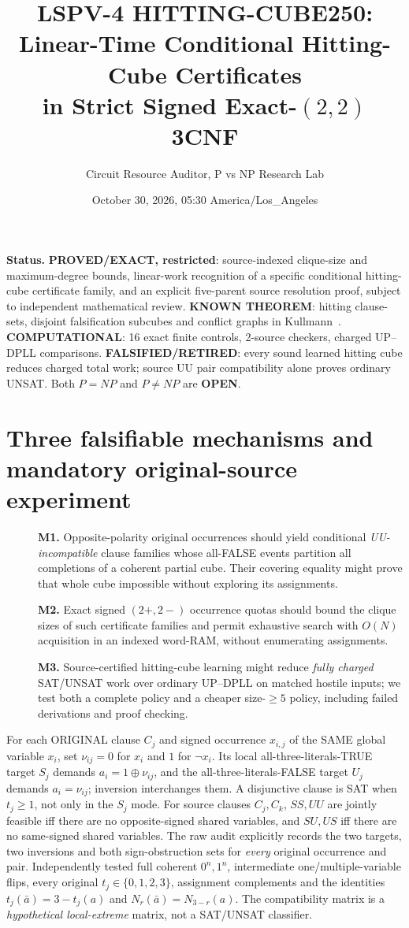 \documentclass[10pt]{article}
\title{LSPV-4 HITTING-CUBE250:\\Linear-Time Conditional Hitting-Cube Certificates\\in Strict Signed Exact-$(2,2)$ 3CNF}
\author{Circuit Resource Auditor, P vs NP Research Lab}
\date{October 30, 2026, 05:30 America/Los\_Angeles}
\begin{document}
\maketitle
\noindent\textbf{Status.} \textbf{PROVED/EXACT, restricted}: source-indexed clique-size and maximum-degree bounds, linear-work recognition of a specific conditional hitting-cube certificate family, and an explicit five-parent source resolution proof, subject to independent mathematical review. \textbf{KNOWN THEOREM}: hitting clause-sets, disjoint falsification subcubes and conflict graphs in Kullmann~\cite{Kullmann2003,Kullmann2011}. \textbf{COMPUTATIONAL}: 16 exact finite controls, 2-source checkers, charged UP--DPLL comparisons. \textbf{FALSIFIED/RETIRED}: every sound learned hitting cube reduces charged total work; source UU pair compatibility alone proves ordinary UNSAT. Both $P=NP$ and $P\ne NP$ are \textbf{OPEN}.

\section{Three falsifiable mechanisms and mandatory original-source experiment}
\begin{description}
\item[]\textbf{M1.} Opposite-polarity original occurrences should yield conditional \emph{UU-incompatible} clause families whose all-FALSE events partition all completions of a coherent partial cube. Their covering equality might prove that whole cube impossible without exploring its assignments.
\item[]\textbf{M2.} Exact signed $(2+,2-)$ occurrence quotas should bound the clique sizes of such certificate families and permit exhaustive search with $O(N)$ acquisition in an indexed word-RAM, without enumerating assignments.
\item[]\textbf{M3.} Source-certified hitting-cube learning might reduce \emph{fully charged} SAT/UNSAT work over ordinary UP--DPLL on matched hostile inputs; we test both a complete policy and a cheaper size-$\ge5$ policy, including failed derivations and proof checking.
\end{description}
For each ORIGINAL clause $C_j$ and signed occurrence $x_{i,j}$ of the SAME global variable $x_i$, set $\nu_{ij}=0$ for $x_i$ and $1$ for $\neg x_i$. Its local all-three-literals-TRUE target $S_j$ demands $a_i=1\oplus\nu_{ij}$, and the all-three-literals-FALSE target $U_j$ demands $a_i=\nu_{ij}$; inversion interchanges them. A disjunctive clause is SAT when $t_j\ge1$, not only in the $S_j$ mode. For source clauses $C_j,C_k$, $SS,UU$ are jointly feasible iff there are no opposite-signed shared variables, and $SU,US$ iff there are no same-signed shared variables. The raw audit explicitly records the two targets, two inversions and both sign-obstruction sets for \emph{every} original occurrence and pair. Independently tested full coherent $0^n,1^n$, intermediate one/multiple-variable flips, every original $t_j\in\{0,1,2,3\}$, assignment complements and the identities $t_j(\bar a)=3-t_j(a)$ and $N_r(\bar a)=N_{3-r}(a)$. The compatibility matrix is a \emph{hypothetical local-extreme} matrix, not a SAT/UNSAT classifier.
\end{document}
